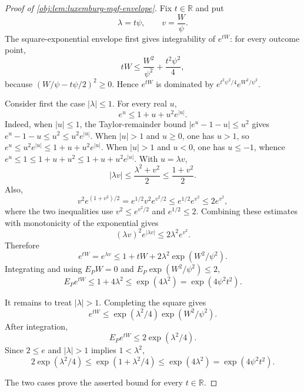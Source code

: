 \documentclass[11pt]{article}
\begin{document}
\begin{proof}[Proof of \cref{obj:lem:luxemburg-mgf-envelope}]
Fix \(t\in\mathbb R\) and put
\[
\lambda=t\psi,\qquad v=\frac{W}{\psi}.
\]
The square-exponential envelope first gives integrability of \(e^{tW}\): for every outcome point,
\[
tW
\le \frac{W^2}{\psi^2}+\frac{t^2\psi^2}{4},
\]
because \((W/\psi-t\psi/2)^2\ge0\).  Hence \(e^{tW}\) is dominated by
\(e^{t^2\psi^2/4}e^{W^2/\psi^2}\). %

Consider first the case \(|\lambda|\le1\).  For every real \(u\),
\[
e^u\le 1+u+u^2e^{|u|}.
\]
Indeed, when \(|u|\le1\), the Taylor-remainder bound
\(|e^u-1-u|\le u^2\) gives \(e^u-1-u\le u^2\le u^2e^{|u|}\).
When \(|u|>1\) and \(u\ge0\), one has \(u>1\), so
\(e^u\le u^2e^{|u|}\le 1+u+u^2e^{|u|}\).  When \(|u|>1\) and
\(u<0\), one has \(u\le-1\), whence \(e^u\le1\le 1+u+u^2\le
1+u+u^2e^{|u|}\). %
With \(u=\lambda v\),
\[
|\lambda v|\le \frac{\lambda^2+v^2}{2}\le \frac{1+v^2}{2}.
\]
Also,
\[
v^2e^{(1+v^2)/2}
=e^{1/2}v^2e^{v^2/2}
\le e^{1/2}e^{v^2}
\le 2e^{v^2},
\]
where the two inequalities use \(v^2\le e^{v^2/2}\) and \(e^{1/2}\le2\).  Combining these estimates with monotonicity of the exponential gives
\[
(\lambda v)^2e^{|\lambda v|}
\le 2\lambda^2e^{v^2}.
\]
Therefore
\[
e^{tW}=e^{\lambda v}
\le 1+tW+2\lambda^2\exp(W^2/\psi^2).
\]
Integrating and using \(E_PW=0\) and \(E_P\exp(W^2/\psi^2)\le2\),
\[
E_Pe^{tW}
\le 1+4\lambda^2
\le \exp(4\lambda^2)
=\exp(4\psi^2t^2).
\]

It remains to treat \(|\lambda|>1\).  Completing the square gives
\[
e^{tW}\le \exp(\lambda^2/4)\exp(W^2/\psi^2).
\]
After integration,
\[
E_Pe^{tW}
\le 2\exp(\lambda^2/4).
\]
Since \(2\le e\) and \(|\lambda|>1\) implies \(1<\lambda^2\),
\[
2\exp(\lambda^2/4)
\le \exp(1+\lambda^2/4)
\le \exp(4\lambda^2)
=\exp(4\psi^2t^2).
\]

The two cases prove the asserted bound for every \(t\in\mathbb R\). %
\end{proof}
\end{document}

